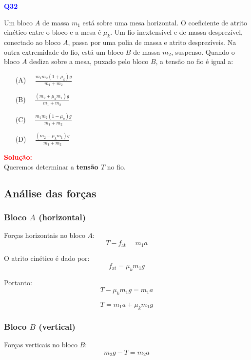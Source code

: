 \documentclass[a4paper,12pt]{article}
\begin{document}
\begin{flushleft}
\textbf{\textcolor{blue}{\Large Q32}}\\
\noindent

Um bloco \(A\) de massa \(m_1\) está sobre uma mesa horizontal.  
O coeficiente de atrito cinético entre o bloco e a mesa é \(\mu_k\).  
Um fio inextensível e de massa desprezível, conectado ao bloco \(A\), passa por uma polia de massa e atrito desprezíveis.  
Na outra extremidade do fio, está um bloco \(B\) de massa \(m_2\), suspenso.  
Quando o bloco \(A\) desliza sobre a mesa, puxado pelo bloco \(B\), a tensão no fio é igual a:


\begin{itemize}
\item[(A)] $\quad \frac{m_1 m_2 (1 + \mu_k) g}{m_1 + m_2}
\qquad$
\item[(B)] $\quad \frac{(m_2 + \mu_k m_1) g}{m_1 + m_2}\qquad$
\item[(C)] $\quad \frac{m_1 m_2 (1 - \mu_k) g}{m_1 + m_2}
\qquad$
\item[(D)] $\quad \frac{(m_2 - \mu_k m_1) g}{m_1 + m_2}$
\end{itemize}

\vspace{0.5cm}


\textcolor{red}{\textbf{Solução:}}\\

Queremos determinar a \textbf{tensão \( T \)} no fio.

\subsection*{Análise das forças}

\subsubsection*{Bloco \( A \) (horizontal)}
Forças horizontais no bloco \( A \):
\[
T - f_{\text{at}} = m_1 a
\]

O atrito cinético é dado por:
\[
f_{\text{at}} = \mu_k m_1 g
\]

Portanto:
\[
T - \mu_k m_1 g = m_1 a
\]

\[
T = m_1 a + \mu_k m_1 g
\]

\subsubsection*{Bloco \( B \) (vertical)}
Forças verticais no bloco \( B \):
\[
m_2 g - T = m_2 a
\]


\end{flushleft}
\end{document}
